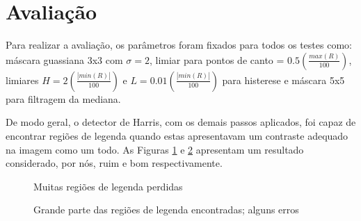 \documentclass[12pt]{article}
\begin{document}
\section{Avaliação}

Para realizar a  avaliação, os parâmetros foram fixados  para todos os
testes  como: máscara  guassiana 3x3  com  $\sigma =  2$, limiar  para
pontos  de  canto  =  $0.5  (\frac{max(R)}{100})$,  limiares  $H  =  2
(\frac{|min(R)|}{100})$  e  $L  =  0.01  (\frac{|min(R)|}{100})$  para
histerese e máscara 5x5 para filtragem da mediana.

De modo geral,  o detector de Harris, com  os demais passos aplicados,
foi capaz de encontrar regiões de legenda quando estas apresentavam um
contraste   adequado   na   imagem   como   um   todo.    As   Figuras
\ref{lowcontrast}   e  \ref{highcontrast}   apresentam   um  resultado
considerado, por nós, ruim e bom respectivamente.

\begin{figure}[h!]
  \centering
  \quad
  \caption{Muitas regiões de legenda perdidas\label{lowcontrast}}
\end{figure}

\begin{figure}[h!]
  \centering
  \quad
  \caption{Grande parte das regiões de legenda encontradas; alguns
    erros\label{highcontrast}}
\end{figure}
\end{document}
